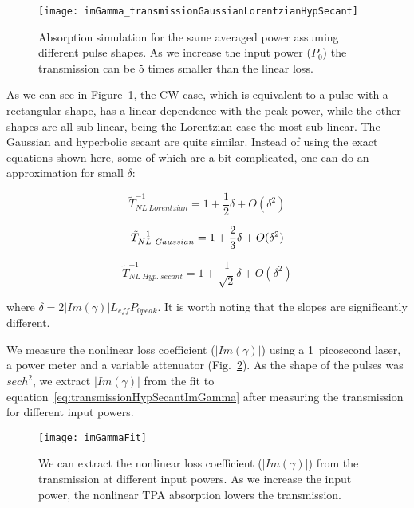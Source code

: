 \begin{figure}[htb]
    \centering
    \texttt{[image: imGamma\_transmissionGaussianLorentzianHypSecant]}
    \caption{Absorption simulation for the same averaged power assuming different pulse shapes. As we increase the input power ($P_0$) the transmission can be 5 times smaller than the linear loss.}
    \label{fig:transmissionGaussianLorentzianHypSecant}
\end{figure}


As we can see in Figure~\ref{fig:transmissionGaussianLorentzianHypSecant}, the CW case, which is equivalent to a pulse with a rectangular shape, has a linear dependence with the peak power, while the other shapes are all sub-linear, being the Lorentzian case the most sub-linear. The Gaussian and hyperbolic secant are quite similar.
Instead of using the exact equations shown here, some of which are a bit complicated, one can do an approximation for small $ \delta $:


\begin{equation}
  \tilde{T}^{-1}_{NL~Lorentzian}   = 1 + \frac{1}{2}\delta + O(\delta^2)
  \end{equation}
  
  \begin{equation}
 \tilde{T}^{-1}_{NL~Gaussian}  = 1 + \frac{2}{3}\delta + O(\delta^2) \\
 \end{equation}
 
 \begin{equation}
 \tilde{T}^{-1}_{NL~Hyp.~secant}  = 1 + \frac{1}{\sqrt{2}}\delta + O(\delta^2)
\end{equation}


where $ \delta = 2|Im(\gamma)| L_{eff} P_{0 peak} $. It is worth noting that the slopes are significantly different.


We measure the nonlinear loss coefficient ($|Im(\gamma)|$) using a 1~picosecond laser, a power meter and a variable attenuator (Fig.~\ref{fig:imGammaSetup}). As the shape of the pulses was $sech^2$, we extract $|Im(\gamma)|$ from the fit to equation~\ref{eq:transmissionHypSecantImGamma} after measuring the transmission for different input powers.

\begin{figure}[htb]
    \centering
    \texttt{[image: imGammaFit]}
    \caption{We can extract the nonlinear loss coefficient ($|Im(\gamma)|$) from the transmission at different input powers. As we increase the input power, the nonlinear TPA absorption lowers the transmission.}
    \label{fig:imGammaSetup}
\end{figure}


